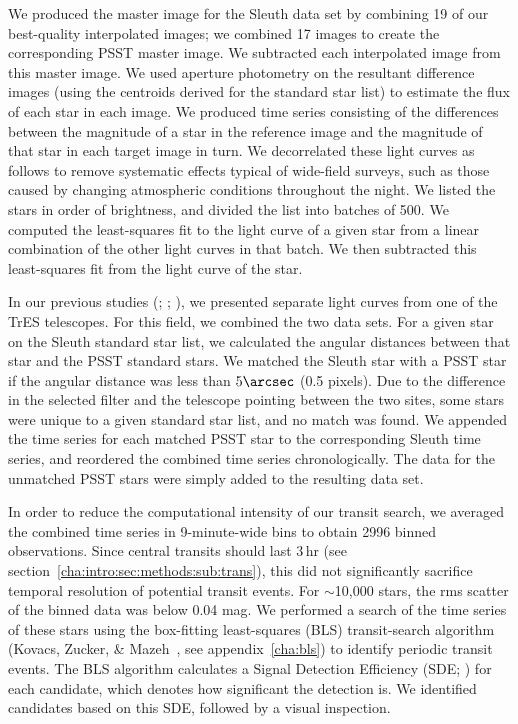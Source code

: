 We produced the master image for the Sleuth data set by combining 19
of our best-quality interpolated images; we combined 17 images to
create the corresponding PSST master image. We subtracted each
interpolated image from this master image. We used aperture photometry
on the resultant difference images (using the centroids derived for
the standard star list) to estimate the flux of each star in each
image. We produced time series consisting of the differences between
the magnitude of a star in the reference image and the magnitude of
that star in each target image in turn. We decorrelated these light
curves as follows to remove systematic effects typical of wide-field
surveys, such as those caused by changing atmospheric conditions
throughout the night. We listed the stars in order of brightness, and
divided the list into batches of 500. We computed the least-squares
fit to the light curve of a given star from a linear combination of
the other light curves in that batch. We then subtracted this
least-squares fit from the light curve of the star.

In our previous studies
(\citealp{Alonso_Brown_Torres:apjl:2004a}; \citealp{Mandushev_Torres_Latham:apj:2005a}; \citealp{Creevey_Benedict_Brown:apjl:2005a}),
we presented separate light curves from one of the TrES telescopes.
For this field, we combined the two data sets. For a given star on the
Sleuth standard star list, we calculated the angular distances between
that star and the PSST standard stars. We matched the Sleuth star with
a PSST star if the angular distance was less than $5\arcsec$ (0.5
pixels). Due to the difference in the selected filter and the
telescope pointing between the two sites, some stars were unique to a
given standard star list, and no match was found. We appended the time
series for each matched PSST star to the corresponding Sleuth time
series, and reordered the combined time series chronologically. The
data for the unmatched PSST stars were simply added to the resulting
data set.

In order to reduce the computational intensity of our transit search,
we averaged the combined time series in 9-minute-wide bins to obtain
2996 binned observations. Since central transits should last 3\,hr (see section~\ref{cha:intro:sec:methods:sub:trans}),
this did not significantly sacrifice temporal resolution of potential
transit events. For $\sim$10,000 stars, the rms scatter of the binned
data was below 0.04 mag. We performed a search of the time series of
these stars using the box-fitting least-squares (BLS) transit-search
algorithm (Kovacs, Zucker, \& Mazeh~\citeyear{Kovacs_Zucker_Mazeh:aa:2002a}, see appendix~\ref{cha:bls}) to identify periodic transit events. The BLS algorithm calculates a Signal
Detection Efficiency (SDE;\@
\citealp[see][]{Kovacs_Zucker_Mazeh:aa:2002a}) for each candidate,%
which denotes how significant the detection is. We identified
candidates based on this SDE, followed by a visual inspection.

